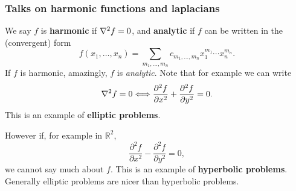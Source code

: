 \subsubsection*{Talks on harmonic functions and laplacians}
We say $f$ is \textbf{harmonic} if $ \laplacian f=0 $, and \textbf{analytic} if $f$ can be written in the (convergent) form 
\[
    f(x_1,\dots,x_n)=\sum_{m_1,\dots,m_n} c_{m_1,\dots,m_n}x_1^{m_1}\cdots x_n^{m_n}.
\]
If $f$ is harmonic, amazingly, $f$ is \textit{analytic}. Note that for example we can write 
\[
    \laplacian f = 0 \Longleftrightarrow \frac{\partial ^2 f}{\partial x^2}+\frac{\partial ^2 f}{\partial y^2}=0.
\]
This is an example of \textbf{elliptic problems}.

However if, for example in $ \mathbb{R}^{2} $,
\[
    \frac{\partial ^2 f}{\partial x^2}-\frac{\partial ^2 f}{\partial y^2}=0,  
\]
we cannot say much about $f$. This is an example of \textbf{hyperbolic problems}. Generally elliptic problems are nicer than hyperbolic problems.

